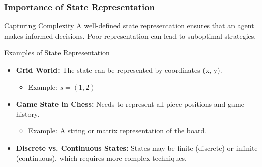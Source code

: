 \documentclass[aspectratio=169]{beamer}
\begin{document}
\begin{frame}[fragile]
    \frametitle{Importance of State Representation}
    \begin{block}{Capturing Complexity}
        A well-defined state representation ensures that an agent makes informed decisions. Poor representation can lead to suboptimal strategies.
    \end{block}
    
    \begin{block}{Examples of State Representation}
        \begin{itemize}
            \item \textbf{Grid World:} The state can be represented by coordinates (x, y).
                \begin{itemize}
                    \item Example: \( s = (1, 2) \)
                \end{itemize}
            \item \textbf{Game State in Chess:} Needs to represent all piece positions and game history.
                \begin{itemize}
                    \item Example: A string or matrix representation of the board.
                \end{itemize}
            \item \textbf{Discrete vs. Continuous States:} States may be finite (discrete) or infinite (continuous), which requires more complex techniques.
        \end{itemize}
    \end{block}
\end{frame}
\end{document}
